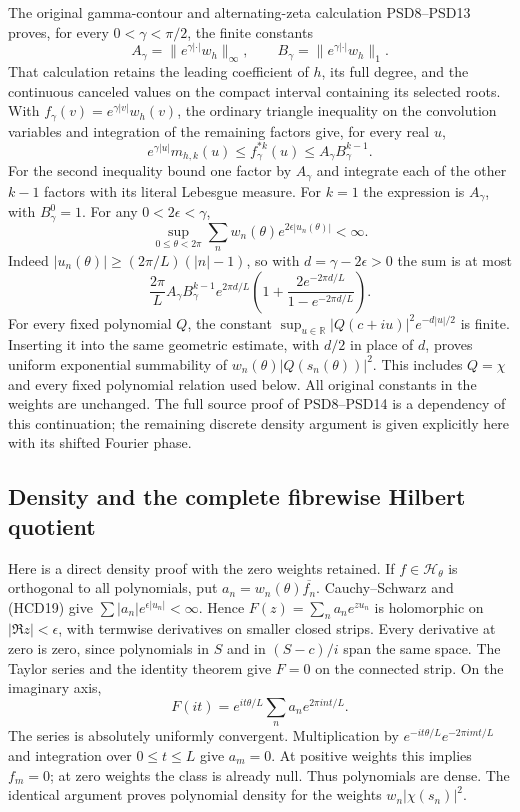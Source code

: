 \documentclass[11pt,a4paper]{article}
\theoremstyle{definition}
\providecommand{\R}{\mathbb R}
\begin{document}
The original gamma-contour and alternating-zeta calculation
PSD8--PSD13 proves, for every $0<\gamma<\pi/2$, the finite
constants
\[
 A_\gamma=\|e^{\gamma|\cdot|}w_h\|_\infty,\qquad
 B_\gamma=\|e^{\gamma|\cdot|}w_h\|_1.
\]
That calculation retains the leading coefficient of $h$,
its full degree, and the continuous canceled values on the
compact interval containing its selected roots. With
$f_\gamma(v)=e^{\gamma|v|}w_h(v)$, the ordinary triangle
inequality on the convolution variables and integration
of the remaining factors give, for every real $u$,
\[
 e^{\gamma|u|}m_{h,k}(u)
 \le f_\gamma^{*k}(u)
 \le A_\gamma B_\gamma^{k-1}.
 \tag{HCD19a}
\]
For the second inequality bound one factor by $A_\gamma$
and integrate each of the other $k-1$ factors with its
literal Lebesgue measure. For $k=1$ the expression is
$A_\gamma$, with $B_\gamma^0=1$.
For any $0<2\epsilon<\gamma$,
\[
 \sup_{0\le\theta<2\pi}
 \sum_nw_n(\theta)e^{2\epsilon|u_n(\theta)|}<\infty.
 \tag{HCD19}
\]
Indeed $|u_n(\theta)|\ge(2\pi/L)(|n|-1)$, so with
$d=\gamma-2\epsilon>0$ the sum is at most
\[
 \frac{2\pi}{L}A_\gamma B_\gamma^{k-1}
 e^{2\pi d/L}
 \left(1+\frac{2e^{-2\pi d/L}}{1-e^{-2\pi d/L}}\right).
\]
For every fixed polynomial $Q$, the constant
$\sup_{u\in\R}|Q(c+iu)|^2e^{-d|u|/2}$ is finite.
Inserting it into the same geometric estimate, with
$d/2$ in place of $d$, proves uniform exponential
summability of $w_n(\theta)|Q(s_n(\theta))|^2$.
This includes $Q=\chi$ and every fixed polynomial
relation used below. All original constants in the
weights are unchanged. The full source proof of
PSD8--PSD14 is a dependency of this continuation;
the remaining discrete density argument is given
explicitly here with its shifted Fourier phase.

\subsection{Density and the complete fibrewise Hilbert quotient}

Here is a direct density proof with the zero weights retained.
If $f\in\mathcal H_\theta$ is orthogonal to all polynomials,
put $a_n=w_n(\theta)\overline{f_n}$. Cauchy--Schwarz and
(HCD19) give $\sum|a_n|e^{\epsilon|u_n|}<\infty$.
Hence $F(z)=\sum_n a_ne^{zu_n}$ is holomorphic on
$|\Re z|<\epsilon$, with termwise derivatives on smaller
closed strips. Every derivative at zero is zero, since
polynomials in $S$ and in $(S-c)/i$ span the same space.
The Taylor series and the identity theorem give $F=0$
on the connected strip. On the imaginary axis,
\[
 F(it)=e^{it\theta/L}\sum_n a_ne^{2\pi int/L}.
\]
The series is absolutely uniformly convergent.
Multiplication by $e^{-it\theta/L}e^{-2\pi imt/L}$ and
integration over $0\le t\le L$ give $a_m=0$.
At positive weights this implies $f_m=0$; at zero weights
the class is already null. Thus polynomials are dense.
The identical argument proves polynomial density for
the weights $w_n|\chi(s_n)|^2$.
\end{document}
